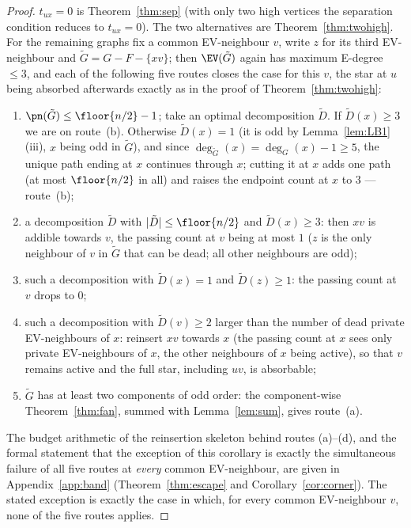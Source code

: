 \begin{proof}
$t_{ux}=0$ is Theorem~\ref{thm:sep} (with only two high vertices the separation condition
reduces to $t_{ux}=0$). The two alternatives are Theorem~\ref{thm:twohigh}. For the remaining
graphs fix a common EV-neighbour $v$, write $z$ for its third EV-neighbour and
$\tilde G=G-F-\{xv\}$; then $\EV(\tilde G)$ again has maximum E-degree $\le3$, and each of the
following five routes closes the case for this $v$, the star at $u$ being absorbed afterwards
exactly as in the proof of Theorem~\ref{thm:twohigh}:
\begin{enumerate}[label={\rm(\alph*)},leftmargin=2em]
\item $\pn(\tilde G)\le\floor{n/2}-1$; take an optimal decomposition $\tilde D$. If
$\tilde D(x)\ge3$ we are on route~(b). Otherwise $\tilde D(x)=1$ (it is odd by
Lemma~\ref{lem:LB1}(iii), $x$ being odd in $\tilde G$), and since
$\deg_{\tilde G}(x)=\deg_G(x)-1\ge5$, the unique path ending at $x$ continues
through $x$; cutting it at $x$ adds one path (at most $\floor{n/2}$ in all)
and raises the endpoint count at $x$ to $3$ --- route~(b);
\item a decomposition $\tilde D$ with $|\tilde D|\le\floor{n/2}$ and $\tilde D(x)\ge3$: then
$xv$ is addible towards $v$, the passing count at $v$ being at most $1$ ($z$ is the only
neighbour of $v$ in $\tilde G$ that can be dead; all other neighbours are odd);
\item such a decomposition with $\tilde D(x)=1$ and $\tilde D(z)\ge1$: the passing count at
$v$ drops to $0$;
\item such a decomposition with $\tilde D(v)\ge2$ larger than the number of dead private
EV-neighbours of $x$: reinsert $xv$ towards $x$ (the passing count at $x$ sees only private
EV-neighbours of $x$, the other neighbours of $x$ being active), so that $v$ remains active
and the full star, including $uv$, is absorbable;
\item $\tilde G$ has at least two components of odd order: the component-wise
Theorem~\ref{thm:fan}, summed with Lemma~\ref{lem:sum}, gives route~(a).
\end{enumerate}
The budget arithmetic of the reinsertion skeleton behind routes (a)--(d),
and the formal statement that the exception of this corollary is exactly the
simultaneous failure of all five routes at \emph{every} common EV-neighbour,
are given in Appendix~\ref{app:band} (Theorem~\ref{thm:escape} and
Corollary~\ref{cor:corner}).
The stated exception is exactly the case in which, for every common EV-neighbour $v$, none of
the five routes applies.


\end{proof}
